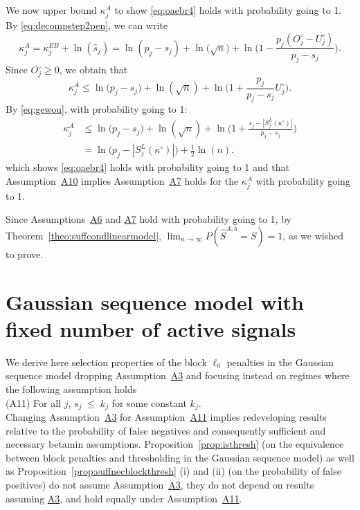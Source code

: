 \documentclass[bj,authoryear]{imsart}
\theoremstyle{plain}
\begin{document}
We now upper bound $\kappa^{A}_j$ to show \eqref{eq:oaebr4} holds with probability going to 1. By \eqref{eq:decompstep2pen}, we can write
    $$\kappa_j^{A}=\kappa_j^{EB}+\ln(\widehat s_j)= \ln(p_j-s_j)+\ln\big(\sqrt{n}\big)+\ln\Big(1-\frac{p_j(O^{\circ}_j-U^{\circ}_j)}{p_j-s_j}\Big).$$
Since $O_j^{\circ} \geq 0$, we obtain that %
\begin{equation*}
    \kappa^{A}_j \leq \ln\big(p_j-s_j\big)+\ln(\sqrt{n})+\ln\bigg(1+\frac{p_j}{p_j-s_j}U^{\circ}_j\bigg).
\end{equation*}
By \eqref{eq:gewou}, with probability going to 1:
\begin{align}\label{eq:finalupperboundkappaj2}
    \kappa_j^A &\leq  \ln\big(p_j-s_j\big)+\ln(\sqrt{n})+\ln\bigg(1+\frac{s_j-|S^{L}_j(\kappa^{\circ})|}{p_j-s_j}\bigg)\nonumber\\
    &= \ln\big(p_j-|S^{L}_j(\kappa^{\circ})|\big)+\frac{1}{2}\ln(n).
\end{align}
which shows \eqref{eq:oaebr4} holds with probability going to 1 and that
Assumption~\hyperlink{lab:A10}{A10} implies Assumption~\hyperlink{lab:A7}{A7} holds for the $\kappa^{A}_j$ with probability going to 1. 

Since Assumptions~\hyperlink{lab:A6}{A6} and \hyperlink{lab:A7}{A7} hold with probability going to 1, by Theorem~\ref{theo:suffcondlinearmodel}, $\lim_{n\to\infty}P(\hat{S}^{A,b}= S)= 1$, as we wished to prove.

\section{Gaussian sequence model with fixed number of active signals}\label{suppsec:appendixGSMsfinite}

We derive here selection properties of the block $\ell_0$ penalties in the Gaussian sequence model dropping Assumption~\hyperlink{lab:A3}{A3} and focusing instead on regimes where the following assumption holds\\[5pt]
\hypertarget{lab:A11}{(A11)} \quad For all $j$, \;$s_j \;\leq\;k_j$ for some constant $k_j$.\\[5pt]
Changing Assumption~\hyperlink{lab:A3}{A3} for Assumption~\hyperlink{lab:A11}{A11} implies redeveloping results relative to the probability of false negatives and consequently sufficient and necessary betamin assumptions. Proposition~\ref{prop:isthresh} (on the equivalence between block penalties and thresholding in the Gaussian sequence model) as well as Proposition~\ref{prop:suffnecblockthresh} (i) and (ii) (on the probability of false positives) do not assume Assumption~\hyperlink{lab:A3}{A3}, they do not depend on results assuming \hyperlink{lab:A3}{A3}, and hold equally under Assumption~\hyperlink{lab:A11}{A11}.
\end{document}
